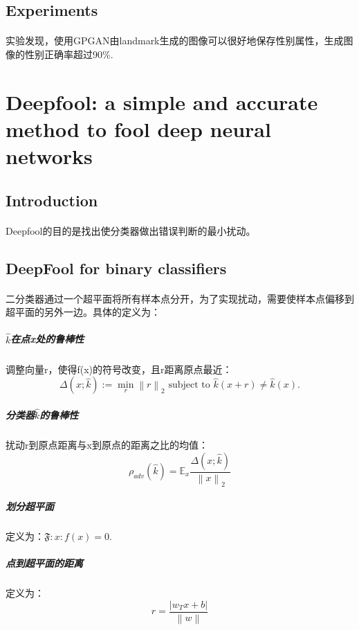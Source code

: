 \documentclass[12pt,a4paper]{article}
\begin{document}
\subsection{Experiments}
\paragraph{} 实验发现，使用GPGAN由landmark生成的图像可以很好地保存性别属性，生成图像的性别正确率超过90\%.

\section{Deepfool: a simple and accurate method to fool deep neural networks\cite{deepfool}}
\subsection{Introduction}
\paragraph{} Deepfool的目的是找出使分类器做出错误判断的最小扰动。
\subsection{DeepFool for binary classifiers}
\paragraph{} 二分类器通过一个超平面将所有样本点分开，为了实现扰动，需要使样本点偏移到超平面的另外一边。具体的定义为：
\subparagraph{$\hat k$在点x处的鲁棒性} 调整向量r，使得f(x)的符号改变，且r距离原点最近：
\begin{equation}
	\Delta(x;\hat k) := \min_r \left \| r \right \|_2 \mbox{ subject to } \hat k(x+r)\neq \hat k(x).
\end{equation}
\subparagraph{分类器$\hat k$的鲁棒性} 扰动r到原点距离与x到原点的距离之比的均值：
\begin{equation}
	\rho_{adv}(\hat k) = \mathbb{E}_x\frac{\Delta(x;\hat k)}{\left \| x \right \|_2}
\end{equation}
\subparagraph{划分超平面} 定义为：$\mathfrak{F}: {x:f(x)=0}$.
\subparagraph{点到超平面的距离\cite{2016机器学习}} 定义为：
\begin{equation}
	r = \frac{|w_Tx+b|}{\left \| w \right \|}
\end{equation}




































\end{document}
